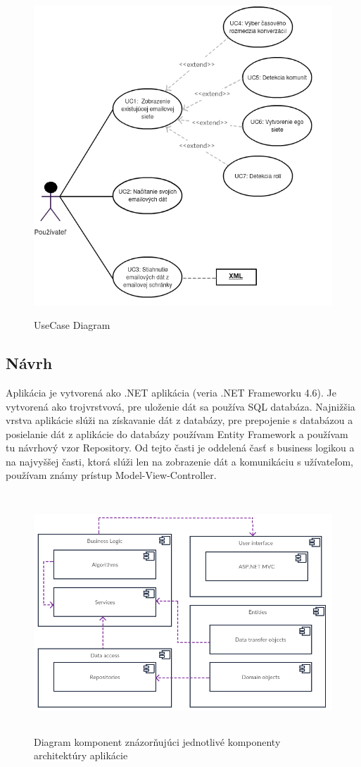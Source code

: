 \documentclass[slovak,master,public,dept460,male,cpdeclaration,oneside]{diploma}
\begin{document}
\begin{figure}[H]
\centering
\includegraphics[width=12cm, height=12cm]{figures/diagram_usecase}
\caption{UseCase Diagram}
\end{figure}


\subsection{Návrh}
Aplikácia je vytvorená ako .NET aplikácia (veria .NET Frameworku 4.6). Je vytvorená ako trojvrstvová, pre uloženie dát sa používa SQL databáza. Najnižšia vrstva aplikácie slúži na získavanie dát z databázy, pre prepojenie s databázou a posielanie dát z aplikácie do databázy používam Entity Framework a používam tu návrhový vzor Repository. Od tejto časti je oddelená časť s business logikou a na najvyššej časti, ktorá slúži len na zobrazenie dát a komunikáciu s užívateľom, používam známy prístup Model-View-Controller.


\begin{figure}[H]
\centering
\includegraphics[width=15cm, height=9cm]{figures/diagram_komponent}
\caption{Diagram komponent znázorňujúci jednotlivé komponenty architektúry aplikácie}
\end{figure}
\end{document}
